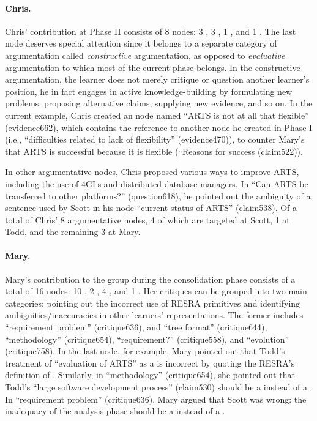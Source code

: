 \paragraph{Chris.}

Chris' contribution at Phase II consists of 8 nodes: 3 , 3 , 1 , and 1
. The last node deserves special attention since it
belongs to a separate category of argumentation called {\it constructive\/}
argumentation, as opposed to {\it evaluative\/} argumentation to which
most of the current phase belongs. In the constructive argumentation, the
learner does not merely critique or question another learner's position, he
in fact engages in active knowledge-building by formulating new problems,
proposing alternative claims, supplying new evidence, and so on. In the
current example, Chris created an  node named ``ARTS
is not at all that flexible'' (evidence662), which contains the reference
to another  node he created in Phase I (i.e.,
``difficulties related to lack of flexibility'' (evidence470)), to counter
Mary's  that ARTS is successful because it is flexible
(``Reasons for success (claim522)).

In other argumentative nodes, Chris proposed various ways to improve ARTS,
including the use of 4GLs and distributed database managers. In ``Can ARTS
be transferred to other platforms?'' (question618), he pointed out the
ambiguity of a sentence used by Scott in his node ``current status of
ARTS'' (claim538). Of a total of Chris' 8 argumentative nodes, 4 of which
are targeted at Scott, 1 at Todd, and the remaining 3 at Mary.


\paragraph{Mary.}

Mary's contribution to the group during the consolidation phase consists of
a total of 16 nodes: 10 , 2 , 4
, and 1 . Her critiques can be
grouped into two main categories: pointing out the incorrect use of RESRA
primitives and identifying ambiguities/inaccuracies in other learners'
representations. The former includes ``requirement problem'' (critique636),
and ``tree format'' (critique644), ``methodology'' (critique654),
``requirement?'' (critique558), and ``evolution'' (critique758). In the
last node, for example, Mary pointed out that Todd's treatment of
``evaluation of ARTS'' as a  is incorrect by quoting the
RESRA's definition of .  Similarly, in ``methodology''
(critique654), she pointed out that Todd's ``large software development
process'' (claim530) should be a  instead of a
. In ``requirement problem'' (critique636), Mary argued
that Scott was wrong: the inadequacy of the analysis phase should be a
 instead of a .

